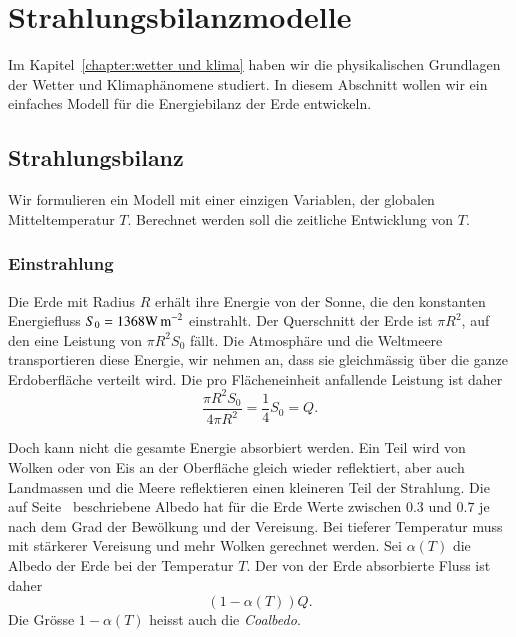 %
%
%
\section{Strahlungsbilanzmodelle\label{skript:section:budyko}}
Im Kapitel~\ref{chapter:wetter und klima} haben wir die physikalischen
Grundlagen der Wetter und Klimaphänomene studiert.
In diesem Abschnitt wollen wir ein einfaches Modell für die Energiebilanz
der Erde entwickeln.

\subsection{Strahlungsbilanz\label{skript:subsection:strahlungsbilanz}}
Wir formulieren ein Modell mit einer einzigen Variablen, der globalen
Mitteltemperatur $T$.
Berechnet werden soll die zeitliche Entwicklung von $T$.

\subsubsection{Einstrahlung}
Die Erde mit Radius $R$ erhält ihre Energie von der Sonne, die
den konstanten Energiefluss $S_0 = 1368 \text{W\,m}^{-2}$
einstrahlt.
Der Querschnitt der Erde ist $\pi R^2$, auf den eine Leistung von
$\pi R^2 S_0$ fällt.
Die Atmosphäre und die Weltmeere transportieren diese Energie, wir nehmen
an, dass sie gleichmässig über die ganze Erdoberfläche verteilt wird.
Die pro Flächeneinheit anfallende Leistung ist daher
\begin{equation}
\frac{\pi R^2 S_0}{4\pi R^2} = \frac14S_0=Q.
\label{skript:bilanz:einstrahlung}
\end{equation}

Doch kann nicht die gesamte Energie absorbiert werden.
Ein Teil wird von Wolken oder von Eis an der Oberfläche 
gleich wieder reflektiert, aber auch Landmassen und die Meere reflektieren
einen kleineren Teil der Strahlung.
Die auf Seite~\pageref{skript:subsubsection:albedo} beschriebene Albedo
hat für die Erde Werte zwischen $0.3$ und $0.7$ je nach dem Grad der
Bewölkung und der Vereisung.
Bei tieferer Temperatur muss mit stärkerer Vereisung und mehr Wolken
gerechnet werden.
Sei $\alpha(T)$ die Albedo der Erde bei der Temperatur $T$.
Der von der Erde absorbierte Fluss ist daher
\begin{equation}
(1-\alpha(T)) Q.
\label{skript:bilanz:ausstrahlung}
\end{equation}
Die Grösse $1-\alpha(T)$ heisst auch die {\em Coalbedo}.
%

